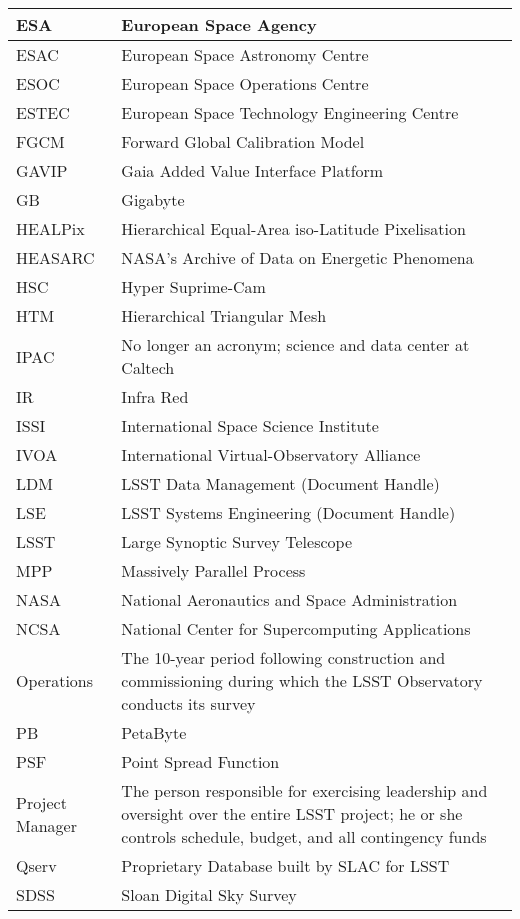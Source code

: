 \begin{longtable}{|l|p{}|}
ESA & European Space Agency \\\hline
ESAC & European Space Astronomy Centre \\\hline
ESOC & European Space Operations Centre \\\hline
ESTEC & European Space Technology Engineering Centre \\\hline
FGCM &  Forward Global Calibration Model \\\hline
GAVIP & Gaia Added Value Interface Platform \\\hline
GB & Gigabyte \\\hline
HEALPix & Hierarchical Equal-Area iso-Latitude Pixelisation \\\hline
HEASARC & NASA's Archive of Data on Energetic Phenomena \\\hline
HSC & Hyper Suprime-Cam \\\hline
HTM & Hierarchical Triangular Mesh \\\hline
IPAC & No longer an acronym; science and data center at Caltech \\\hline
IR & Infra Red \\\hline
ISSI & International Space Science Institute \\\hline
IVOA & International Virtual-Observatory Alliance \\\hline
LDM & LSST Data Management (Document Handle) \\\hline
LSE & LSST Systems Engineering (Document Handle) \\\hline
LSST & Large Synoptic Survey Telescope \\\hline
MPP & Massively Parallel Process \\\hline
NASA & National Aeronautics and Space Administration \\\hline
NCSA & National Center for Supercomputing Applications \\\hline
Operations & The 10-year period following construction and commissioning during which the LSST Observatory conducts its survey \\\hline
PB & PetaByte \\\hline
PSF & Point Spread Function \\\hline
Project Manager & The person responsible for exercising leadership and oversight over the entire LSST project; he or she controls schedule, budget, and all contingency funds \\\hline
Qserv & Proprietary Database built by SLAC for LSST \\\hline
SDSS & Sloan Digital Sky Survey \\\hline

\end{longtable}
